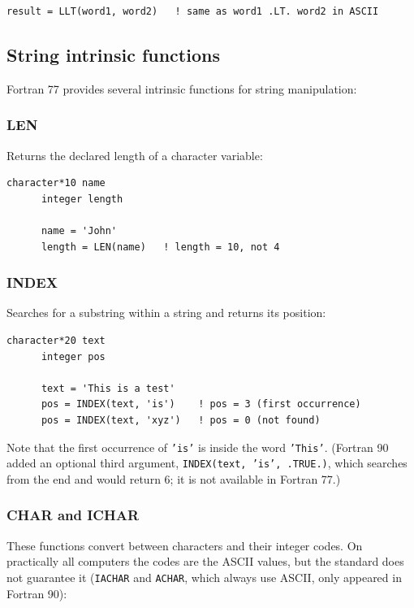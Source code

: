 \begin{lstlisting}[style=fortran77]
      result = LLT(word1, word2)   ! same as word1 .LT. word2 in ASCII
\end{lstlisting}

\subsection{String intrinsic functions}

Fortran 77 provides several intrinsic functions for string manipulation:

\subsubsection{LEN}

Returns the declared length of a character variable:

\begin{lstlisting}[style=fortran77]
      character*10 name
      integer length
      
      name = 'John'
      length = LEN(name)   ! length = 10, not 4
\end{lstlisting}

\subsubsection{INDEX}

Searches for a substring within a string and returns its position:

\begin{lstlisting}[style=fortran77]
      character*20 text
      integer pos
      
      text = 'This is a test'
      pos = INDEX(text, 'is')    ! pos = 3 (first occurrence)
      pos = INDEX(text, 'xyz')   ! pos = 0 (not found)
\end{lstlisting}

Note that the first occurrence of \texttt{'is'} is inside the word \texttt{'This'}. (Fortran 90 added an optional third argument, \texttt{INDEX(text, 'is', .TRUE.)}, which searches from the end and would return 6; it is not available in Fortran 77.)

\subsubsection{CHAR and ICHAR}

These functions convert between characters and their integer codes. On practically all computers the codes are the ASCII values, but the standard does not guarantee it (\texttt{IACHAR} and \texttt{ACHAR}, which always use ASCII, only appeared in Fortran 90):

